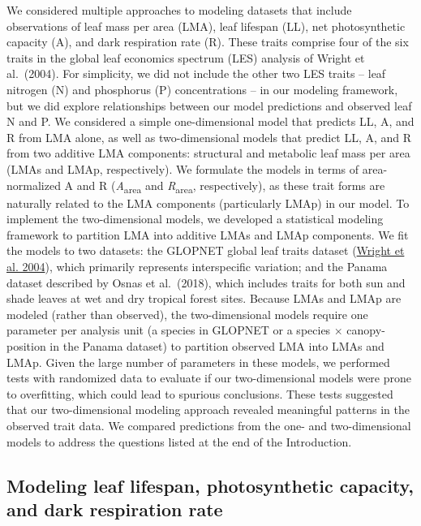 \documentclass[
  12pt,
]{article}
\begin{document}
We considered multiple approaches to modeling datasets that include observations of leaf mass per area (LMA), leaf lifespan (LL), net photosynthetic capacity (A), and dark respiration rate (R).
These traits comprise four of the six traits in the global leaf economics spectrum (LES) analysis of Wright et al.~(2004).
For simplicity, we did not include the other two LES traits -- leaf nitrogen (N) and phosphorus (P) concentrations -- in our modeling framework, but we did explore relationships between our model predictions and observed leaf N and P.
We considered a simple one-dimensional model that predicts LL, A, and R from LMA alone, as well as two-dimensional models that predict LL, A, and R from two additive LMA components: structural and metabolic leaf mass per area (LMAs and LMAp, respectively).
We formulate the models in terms of area-normalized A and R (\emph{A}\textsubscript{area} and \emph{R}\textsubscript{area}, respectively), as these trait forms are naturally related to the LMA components (particularly LMAp) in our model.
To implement the two-dimensional models, we developed a statistical modeling framework to partition LMA into additive LMAs and LMAp components.
We fit the models to two datasets: the GLOPNET global leaf traits dataset (\protect\hyperlink{ref-Wright2004a}{Wright et al. 2004}), which primarily represents interspecific variation; and the Panama dataset described by Osnas et al.~(2018), which includes traits for both sun and shade leaves at wet and dry tropical forest sites.
Because LMAs and LMAp are modeled (rather than observed), the two-dimensional models require one parameter per analysis unit (a species in GLOPNET or a species \(\times\) canopy-position in the Panama dataset) to partition observed LMA into LMAs and LMAp.
Given the large number of parameters in these models, we performed tests with randomized data to evaluate if our two-dimensional models were prone to overfitting, which could lead to spurious conclusions.
These tests suggested that our two-dimensional modeling approach revealed meaningful patterns in the observed trait data.
We compared predictions from the one- and two-dimensional models to address the questions listed at the end of the Introduction.

\hypertarget{modeling-leaf-lifespan-photosynthetic-capacity-and-dark-respiration-rate}{%
\subsection{Modeling leaf lifespan, photosynthetic capacity, and dark respiration rate}\label{modeling-leaf-lifespan-photosynthetic-capacity-and-dark-respiration-rate}}
\end{document}
